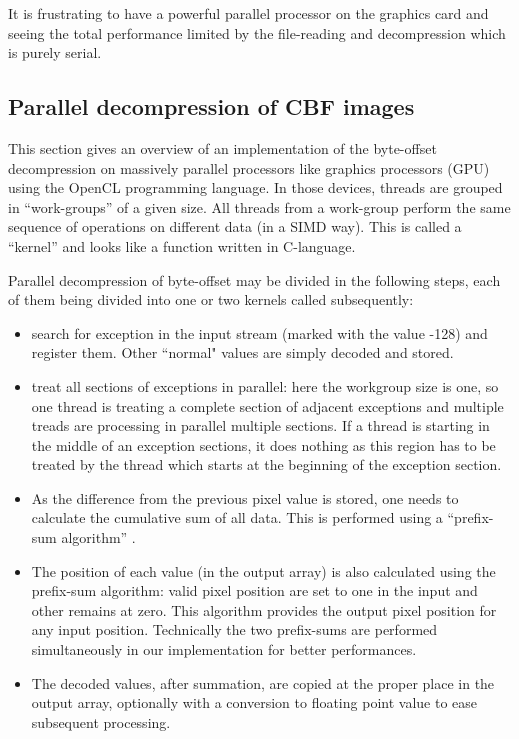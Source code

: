 \documentclass[preprint]{iucr}              %
\begin{document}
It is frustrating to have a powerful parallel processor on the
graphics card and seeing the total performance limited by the file-reading
 and decompression which is purely serial.

\subsection{Parallel decompression of CBF images}
 
This section gives an overview of an implementation of the byte-offset
decompression on massively parallel processors like graphics processors
(GPU) using the OpenCL \cite{opencl} programming language.
In those devices, threads are grouped in ``work-groups'' of a given size.
All threads from a work-group perform the same sequence of operations on
different data (in a SIMD way).
This is called a ``kernel'' and looks like a function written in C-language.

Parallel decompression of byte-offset may be divided in the following steps,
each of them being divided into one or two kernels called subsequently:
\begin{itemize}
  \item search for exception in the input stream (marked with the value -128)
  and register them. Other ``normal" values are simply decoded and stored.
  \item treat all sections of exceptions in parallel: here the workgroup size is
  one, so one thread is treating a complete section of adjacent exceptions
  and multiple treads are processing in parallel multiple sections. If a thread
  is starting in the middle of an exception sections, it does nothing as this
  region has to be treated by the thread which starts at the beginning of the 
  exception section.
  \item As the difference from the previous pixel value is stored, one needs to
  calculate the cumulative sum of all data. This is performed using a
  ``prefix-sum algorithm'' \cite{scan}.
  \item The position of each value (in the output array) is also calculated
  using the prefix-sum algorithm: valid pixel position are set to one in the
  input and other remains at zero. This algorithm provides the output pixel
  position for any input position.
  Technically the two prefix-sums are performed simultaneously in our
  implementation for better performances.
  \item The decoded values, after summation, are copied at the proper place in
  the output array, optionally with a conversion to floating point value to
  ease subsequent processing.
\end{itemize} 
\end{document}
